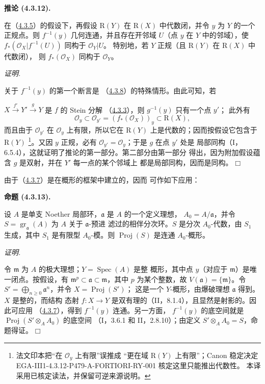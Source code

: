 \documentclass[UTF8,fontset=none,11pt,oneside,openany]{ctexbook}
\providecommand{\square}{\mdlgwhtsquare}
\newcommand{\SourceCorrectionNote}[1]{\footnote{#1}}
\newenvironment{proposition}[1][]{%
  \par\medskip\noindent\textbf{命题 (#1).}\ %
}{\par}
\newenvironment{corollary}[1][]{%
  \par\medskip\noindent\textbf{推论 (#1).}\ %
}{\par}
\newenvironment{proof}{%
  \par\smallskip\noindent\textit{证明.}\ %
}{\hfill$\square$\par}
\newcommand{\oldpage}[2][]{%
  \hypertarget{ega-source-page-#1-#2}{}%
  \marginnote{\scriptsize\textbf{#1}~|~#2}\ignorespaces}
\let\EGAOriginalLabel\label
\renewcommand{\label}[1]{\phantomsection\EGAOriginalLabel{#1}}
\begin{document}
\begin{corollary}[4.3.12]
\label{III.4.3.12-fr}
在（\hyperref[III.4.3.5-fr]{4.3.5}）的假设下，再假设
$\mathrm R(Y)$ 在 $\mathrm R(X)$ 中代数闭，并令 $y$ 为 $Y$ 的一个
正规点。则 $f^{-1}(y)$ 几何连通，并且存在开邻域 $U$（点 $y$ 在
$Y$ 中的邻域），使 $f_*(\mathcal O_X|f^{-1}(U))$ 同构于 $\mathcal O_Y|U$。
特别地，若 $Y$ 正规（且 $\mathrm R(Y)$ 在 $\mathrm R(X)$ 中代数闭），
则 $f_*(\mathcal O_X)$ 同构于 $\mathcal O_Y$。
\end{corollary}

\begin{proof}
关于 $f^{-1}(y)$ 的第一个断言是
（\hyperref[III.4.3.8-fr]{4.3.8}）的特殊情形。由此可知，若

\oldpage[III]{135}

$X\xrightarrow{f'}Y'\xrightarrow{g}Y$ 是 $f$ 的 Stein 分解
（\hyperref[III.4.3.3-fr]{4.3.3}），则 $g^{-1}(y)$ 只有一个点 $y'$；
此外有
\[
\mathcal O_y\subset\mathcal O_{y'}=(f_*(\mathcal O_X))_y
\subset\mathrm R(X),
\]
而且由于 $\mathcal O_{y'}$ 在 $\mathcal O_y$ 上有限，所以它在
$\mathrm R(Y)$ 上是代数的；因而按假设它包含于 $\mathrm R(Y)$
\SourceCorrectionNote{法文印本把“在 $\mathcal O_y$ 上有限”误推成
“更在域 $\mathrm R(Y)$ 上有限”；Canon 稳定决定
EGA-III1-4.3.12-P479-A-FORTIORI-RY-001 核定这里只能推出代数性。
本译采用已核定读法，并保留可逆来源说明。}。又因 $y$
正规，必有 $\mathcal O_{y'}=\mathcal O_y$；于是 $g$ 在点 $y'$ 处是
局部同构（I，6.5.4），这就证明了推论的第一部分。第二部分由第一部分
得出，因为附加假设蕴含 $g$ 是双射，并在 $Y'$ 每一点的某个邻域上
都是局部同构，因而是同构。
\end{proof}

由于（\hyperref[III.4.3.7-fr]{4.3.7}）是在概形的框架中建立的，因而
可作如下应用：

\begin{proposition}[4.3.13]
\label{III.4.3.13-fr}
设 $A$ 是单支 Noether 局部环，$\mathfrak a$ 是 $A$ 的一个定义理想，
$A_0=A/\mathfrak a$，并令
$S=\operatorname{gr}_{\mathfrak a}(A)$ 为 $A$ 关于 $\mathfrak a$-预进
滤过的相伴分次环。$S$ 是分次 $A_0$-代数，由 $S_1$ 生成，其中 $S_1$
是有限型 $A_0$-模。则 $\operatorname{Proj}(S)$ 是连通 $A_0$-概形。
\end{proposition}

\begin{proof}
令 $\mathfrak m$ 为 $A$ 的极大理想；$Y=\operatorname{Spec}(A)$ 是整
概形，其中点 $y$（对应于 $\mathfrak m$）是唯一闭点。按假设，有
$\mathfrak m^p\subset\mathfrak a\subset\mathfrak m$，其中 $p$ 为某个整数，故
$V(\mathfrak a)=\{\mathfrak m\}$。令
$S'=\bigoplus_{n\geq0}\mathfrak a^n$，并令 $X=\operatorname{Proj}(S')$；
这是一个 $Y$-概形，由爆破理想 $\mathfrak a$ 得到。$X$ 是整的，而结构
态射 $f:X\to Y$ 是双有理的（II，8.1.4），且显然是射影的。因此可应用
（\hyperref[III.4.3.7-fr]{4.3.7}），得到 $f^{-1}(y)$ 连通。另一方面，
$f^{-1}(y)$ 的底空间就是 $\operatorname{Proj}(S'\otimes_AA_0)$ 的底空间
（I，3.6.1 和 II，2.8.10）；由定义 $S'\otimes_AA_0=S$，命题得证。
\end{proof}
\end{document}
